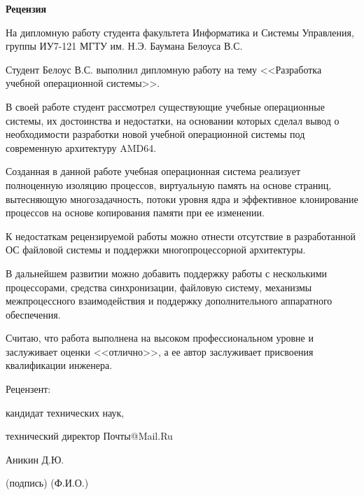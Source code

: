 \documentclass[utf8x, 12pt]{G7-32} %
\begin{document}

\begin{center}
	\textbf{Рецензия}

На дипломную работу студента факультета Информатика и Системы Управления,
группы ИУ7-121 МГТУ им. Н.Э. Баумана Белоуса В.С.
\end{center}

\vskip 1cm

Студент Белоус В.С. выполнил дипломную работу на тему <<Разработка учебной операционной системы>>.

В своей работе студент рассмотрел существующие учебные операционные системы, их достоинства и недостатки,
на основании которых сделал вывод о необходимости разработки новой учебной операционной системы
под современную архитектуру AMD64.

Созданная в данной работе учебная операционная система реализует
полноценную изоляцию процессов, виртуальную память на основе страниц, вытесняющую
многозадачность, потоки уровня ядра и эффективное клонирование процессов на основе
копирования памяти при ее изменении.

К недостаткам рецензируемой работы можно отнести отсутствие в разработанной ОС файловой системы
и поддержки многопроцессорной архитектуры.

В дальнейшем развитии можно добавить поддержку работы с несколькими процессорами,
средства синхронизации, файловую систему, механизмы межпроцессного взаимодействия
и поддержку дополнительного аппаратного обеспечения.

Считаю, что работа выполнена на высоком профессиональном уровне и заслуживает оценки <<отлично>>,
а ее автор заслуживает присвоения квалификации инженера.

\vskip 5cm
\begin{flushleft}
Рецензент:

кандидат технических наук,

технический директор Почты@Mail.Ru

\underline{\hskip 5cm} Аникин Д.Ю.

\hskip 1cm (подпись) \hskip 2.8cm (Ф.И.О.)
\end{flushleft}
\end{document}
